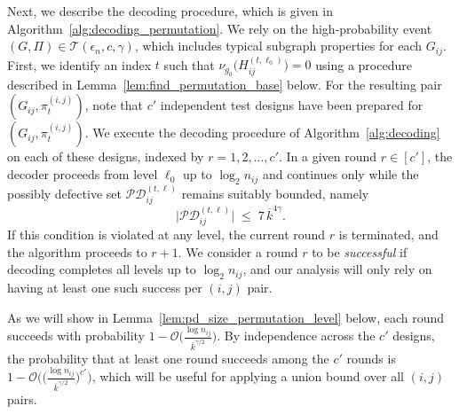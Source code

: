 \documentclass[journal]{IEEEtran}
\theoremstyle{definition}
\theoremstyle{definition}
\newcommand{\Tc}{\mathcal{T}}
\newcommand{\PV}{\nu}
\newcommand{\kb}{\overline{k}}
\newcommand{\bigO}{\mathcal{O}}
\begin{document}

Next, we describe the decoding procedure, which is given in Algorithm~\ref{alg:decoding_permutation}.  We rely on the high-probability event $(G,\Pi) \in \Tc(\epsilon_n,c,\gamma)$, which includes typical subgraph properties for each $G_{ij}$.  
First, we identify an index $t$ such that $\PV_{g_0} \big(H_{ij}^{(t,\ell_0)}\big)=0$ using a procedure described in Lemma~\ref{lem:find_permutation_base} below. 
For the resulting pair $(G_{ij},\pi_t^{(i,j)})$, note that $c'$ independent test designs have been prepared for $(G_{ij},\pi_t^{(i,j)})$.
We execute the decoding procedure of Algorithm~\ref{alg:decoding} on each of these designs, indexed by $r=1,2,\ldots,c'$.
In a given round $r\in[c']$, the decoder proceeds from level $\ell_0$ up to $\log_2 n_{ij}$ and continues only while the possibly defective set $\mathcal{PD}_{ij}^{(t,\ell)}$ remains suitably bounded, namely
\[
  \big|\mathcal{PD}_{ij}^{(t,\ell)}\big| \;\le\; 7\,\kb^{4\gamma}.
\]
If this condition is violated at any level, the current round $r$ is terminated, and the algorithm proceeds to $r+1$.
We consider a round $r$ to be \emph{successful} if decoding completes all levels up to $\log_2 n_{ij}$, and our analysis will only rely on having at least one such success per $(i,j)$ pair.

As we will show in Lemma~\ref{lem:pd_size_permutation_level} below, each round succeeds with probability $1-\bigO\Big(\tfrac{\log n_{ij}}{\kb^{\gamma/2}}\Big)$. 
By independence across the $c'$ designs, the probability that at least one round succeeds among the $c'$ rounds is $1 - \bigO \Big( \big(\tfrac{\log n_{ij}}{\kb^{\gamma/2}}\big)^{c'} \Big)$, which will be useful for applying a union bound over all $(i,j)$ pairs.
\end{document}

